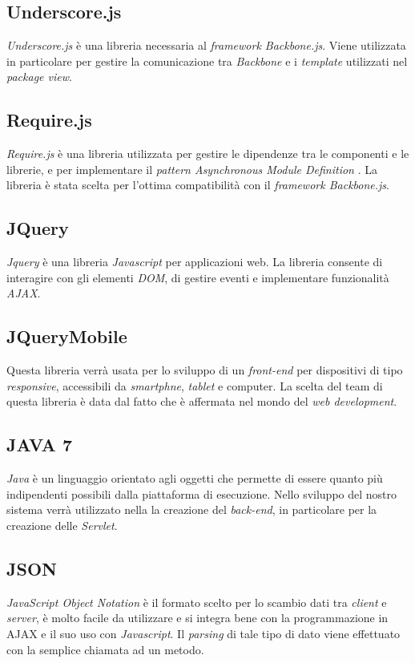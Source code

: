 \subsection{Underscore.js}
\textit{Underscore.js} è una libreria necessaria al \textit{framework Backbone.js}. Viene utilizzata in particolare per gestire la comunicazione tra \textit{Backbone} e i \textit{template} utilizzati nel \textit{package view}.
\subsection{Require.js}
\textit{Require.js} è una libreria utilizzata per gestire le dipendenze tra le componenti e le librerie, e per implementare il \textit{pattern Asynchronous Module Definition
}. La libreria è stata scelta per l'ottima compatibilità con il \textit{framework Backbone.js}.
\subsection{JQuery}
\textit{Jquery} è una libreria \textit{Javascript} per applicazioni web.
La libreria consente di interagire con gli elementi \textit{DOM}, di gestire eventi e implementare funzionalità \textit{AJAX}.
\subsection{JQueryMobile}
Questa libreria verrà usata per lo sviluppo di un \textit{front-end} per dispositivi di tipo \textit{responsive}, accessibili da \textit{smartphne}, \textit{tablet} e computer. La scelta del team di questa libreria è data dal fatto che è affermata nel mondo del \textit{web development}.
\subsection{JAVA 7}
\textit{Java} è un linguaggio orientato agli oggetti che permette di essere quanto più indipendenti possibili dalla piattaforma di esecuzione. Nello sviluppo del nostro sistema verrà utilizzato nella la creazione del \textit{back-end}, in particolare per la creazione delle \textit{Servlet}.
\subsection{JSON}
\textit{JavaScript Object Notation} è il formato scelto per lo scambio dati tra \textit{client} e \textit{server}, è molto facile da utilizzare e si integra bene con la programmazione in AJAX e il suo uso con \textit{Javascript}. Il \textit{parsing} di tale tipo di dato viene effettuato con la semplice chiamata ad un metodo.
